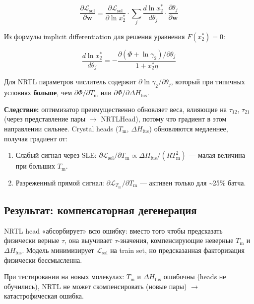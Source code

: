 \documentclass[11pt]{article}
\begin{document}
\begin{equation*}
\frac{\partial \mathcal{L}_{\mathrm{sol}}}{\partial \mathbf{w}} = \frac{\partial \mathcal{L}_{\mathrm{sol}}}{\partial \ln x_2^*} \cdot \sum_{j} \frac{d\ln x_2^*}{d\theta_j} \cdot \frac{\partial \theta_j}{\partial \mathbf{w}}
\end{equation*}

Из формулы implicit differentiation для решения уравнения $F(x_2^*)=0$:

\begin{equation*}
\frac{d\ln x_2^*}{d\theta_j} = -\frac{\partial(\Phi + \ln\gamma_2)/\partial\theta_j}{1 + x_2^* \eta}
\end{equation*}

Для NRTL параметров числитель содержит $\partial \ln\gamma_2/\partial\theta_j$, который при типичных условиях \textbf{больше}, чем $\partial\Phi/\partial T_{\mathrm{m}}$ или $\partial\Phi/\partial\Delta H_{\mathrm{fus}}$.

\textbf{Следствие:} оптимизатор преимущественно обновляет веса, влияющие на $\tau_{12}$, $\tau_{21}$ (через представление пары $\to$ NRTLHead), потому что градиент в этом направлении сильнее. Crystal heads ($T_{\mathrm{m}}$, $\Delta H_{\mathrm{fus}}$) обновляются медленнее, получая градиент от:

\begin{enumerate}
  \item Слабый сигнал через SLE: $\partial\mathcal{L}_{\mathrm{sol}}/\partial T_{\mathrm{m}} \propto \Delta H_{\mathrm{fus}}/(RT_{\mathrm{m}}^2)$ --- малая величина при больших $T_{\mathrm{m}}$.
  \item Разреженный прямой сигнал: $\partial\mathcal{L}_{T_{\mathrm{m}}}/\partial T_{\mathrm{m}}$ --- активен только для \textasciitilde25\% батча.
\end{enumerate}

\subsection{Результат: компенсаторная дегенерация}

NRTL head «абсорбирует» всю ошибку: вместо того чтобы предсказать физически верные $\tau$, она выучивает $\tau$-значения, компенсирующие неверные $T_{\mathrm{m}}$ и $\Delta H_{\mathrm{fus}}$. Модель минимизирует $\mathcal{L}_{\mathrm{sol}}$ на train set, но предсказанная факторизация физически бессмысленна.

При тестировании на новых молекулах: $T_{\mathrm{m}}$ и $\Delta H_{\mathrm{fus}}$ ошибочны (heads не обучились), NRTL не может скомпенсировать (новые пары) $\to$ катастрофическая ошибка.
\end{document}
